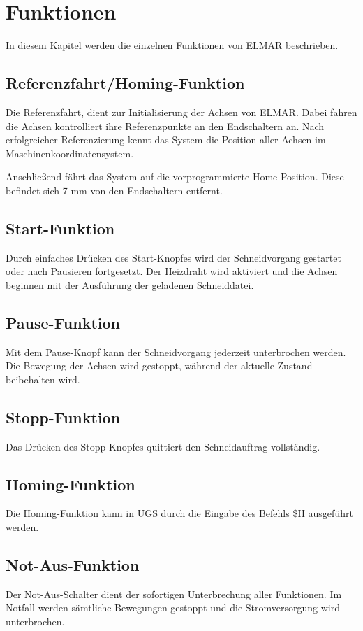 %
%

\chapter{Funktionen}

In diesem Kapitel werden die einzelnen Funktionen von ELMAR beschrieben.

\section{Referenzfahrt/Homing-Funktion}

Die Referenzfahrt, dient zur Initialisierung der Achsen von ELMAR. Dabei fahren die Achsen kontrolliert ihre Referenzpunkte an den Endschaltern an. Nach erfolgreicher Referenzierung kennt das System die Position aller Achsen im Maschinenkoordinatensystem.

Anschließend fährt das System auf die vorprogrammierte Home-Position. Diese befindet sich 7 mm von den Endschaltern entfernt.

\section{Start-Funktion}

Durch einfaches Drücken des Start-Knopfes wird der Schneidvorgang gestartet oder nach Pausieren fortgesetzt. 
Der Heizdraht wird aktiviert und die Achsen beginnen mit der Ausführung der geladenen Schneiddatei.

\section{Pause-Funktion}

Mit dem Pause-Knopf kann der Schneidvorgang jederzeit unterbrochen werden. 
Die Bewegung der Achsen wird gestoppt, während der aktuelle Zustand beibehalten wird.

\section{Stopp-Funktion}

Das Drücken des Stopp-Knopfes quittiert den Schneidauftrag vollständig.

\section{Homing-Funktion}
 
Die Homing-Funktion kann in UGS durch die Eingabe des Befehls \$H ausgeführt werden.
\section{Not-Aus-Funktion}

Der Not-Aus-Schalter dient der sofortigen Unterbrechung aller Funktionen. 
Im Notfall werden sämtliche Bewegungen gestoppt und die Stromversorgung wird unterbrochen.